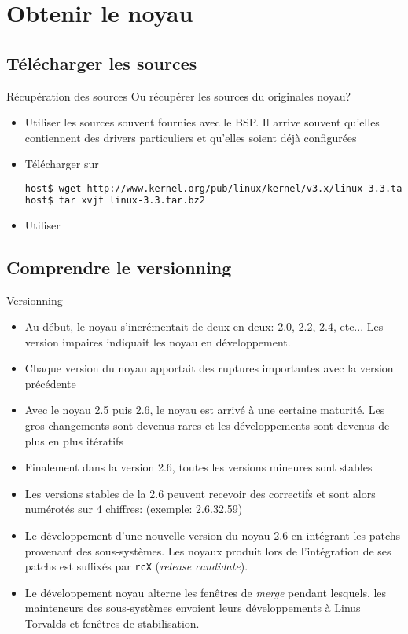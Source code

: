 \section{Obtenir le noyau}

\subsection{Télécharger les sources}

\begin{frame}[fragile=singleslide]{Récupération des sources}
  Ou récupérer les sources du originales noyau?
  \begin{itemize} 
  \item Utiliser les sources souvent  fournies avec le BSP.  Il arrive
    souvent qu'elles contiennent  des drivers particuliers et qu'elles
    soient déjà configurées
  \item Télécharger sur 
    \begin{lstlisting}[language=sh]
host$ wget http://www.kernel.org/pub/linux/kernel/v3.x/linux-3.3.tar.bz2
host$ tar xvjf linux-3.3.tar.bz2
    \end{lstlisting}
  \item Utiliser 
  \end{itemize} 
\end{frame} 

\subsection{Comprendre le versionning}

\begin{frame}[fragile=singleslide]{Versionning}
  \begin{itemize}
  \item Au début, le noyau s'incrémentait de deux en deux: 2.0, 2.2, 2.4,
    etc... Les version impaires indiquait les noyau en développement.
  \item  Chaque version  du noyau  apportait des  ruptures importantes
    avec la version précédente
  \item Avec le noyau 2.5 puis 2.6, le noyau est arrivé à une certaine
    maturité.   Les  gros  changements   sont  devenus  rares  et  les
    développements sont devenus de plus en plus itératifs
  \item Finalement  dans la version 2.6, toutes  les versions mineures
    sont stables
  \item Les versions stables de la 2.6 peuvent recevoir des correctifs
    et sont alors numérotés sur 4 chiffres: (exemple: 2.6.32.59)
  \item  Le  développement d'une  nouvelle  version  du  noyau 2.6  en
    intégrant  les  patchs provenant  des  sous-systèmes.  Les  noyaux
    produit  lors de  l'intégration  de ses  patchs  est suffixés  par
    \texttt{rcX} (\emph{release candidate}).
  \item Le  développement noyau  alterne les fenêtres  de \emph{merge}
    pendant lesquels, les mainteneurs des sous-systèmes envoient leurs
    développements à Linus Torvalds et fenêtres de stabilisation.
  \end{itemize}
\end{frame}

